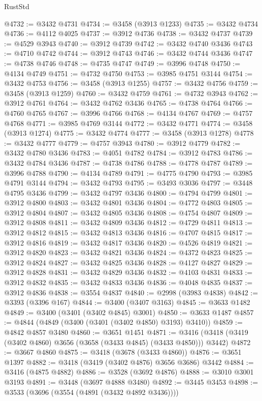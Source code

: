 \begin{lexlean}{RustStd}
\begin{coremodule}
@4732 := @3432 @4731
@4734 := @3458 (@3913 @1233)
@4735 := @3432 @4734
@4736 := @4112 @4025
@4737 := @3912 @4736
@4738 := @3432 @4737
@4739 := @4529 @3943
@4740 := @3912 @4739
@4742 := @3432 @4740 @3436
@4743 := @4710 @4742
@4744 := @3912 @4743
@4746 := @3432 @4744 @3436
@4747 := @4738 @4746
@4748 := @4735 @4747
@4749 := @3996 @4748
@4750 := @4134 @4749
@4751 := @4732 @4750
@4753 := @3985 @4751 @3144
@4754 := @3432 @4753
@4756 := @3458 (@3913 @1255)
@4757 := @3432 @4756
@4759 := @3458 (@3913 @1259)
@4760 := @3432 @4759
@4761 := @4732 @3943
@4762 := @3912 @4761
@4764 := @3432 @4762 @3436
@4765 := @4738 @4764
@4766 := @4760 @4765
@4767 := @3996 @4766
@4768 := @4134 @4767
@4769 := @4757 @4768
@4771 := @3985 @4769 @3144
@4772 := @3432 @4771
@4774 := @3458 (@3913 @1274)
@4775 := @3432 @4774
@4777 := @3458 (@3913 @1278)
@4778 := @3432 @4777
@4779 := @4757 @3943
@4780 := @3912 @4779
@4782 := @3432 @4780 @3436
@4783 := @4051 @4782
@4784 := @3912 @4783
@4786 := @3432 @4784 @3436
@4787 := @4738 @4786
@4788 := @4778 @4787
@4789 := @3996 @4788
@4790 := @4134 @4789
@4791 := @4775 @4790
@4793 := @3985 @4791 @3144
@4794 := @3432 @4793
@4795 := @3493 @3036
@4797 := @3448 @4795 @3436
@4799 := @3432 @4797 @3436
@4800 := @4794 @4799
@4801 := @3912 @4800
@4803 := @3432 @4801 @3436
@4804 := @4772 @4803
@4805 := @3912 @4804
@4807 := @3432 @4805 @3436
@4808 := @4754 @4807
@4809 := @3912 @4808
@4811 := @3432 @4809 @3436
@4812 := @4729 @4811
@4813 := @3912 @4812
@4815 := @3432 @4813 @3436
@4816 := @4707 @4815
@4817 := @3912 @4816
@4819 := @3432 @4817 @3436
@4820 := @4526 @4819
@4821 := @3912 @4820
@4823 := @3432 @4821 @3436
@4824 := @4372 @4823
@4825 := @3912 @4824
@4827 := @3432 @4825 @3436
@4828 := @4127 @4827
@4829 := @3912 @4828
@4831 := @3432 @4829 @3436
@4832 := @4103 @4831
@4833 := @3912 @4832
@4835 := @3432 @4833 @3436
@4836 := @4048 @4835
@4837 := @3912 @4836
@4838 := @3554 @4837
@4840 := @2998 (@3983 @4838)
@4842 := @3393 (@3396 @167)
@4844 := @3400 (@3407 @3163)
@4845 := @3633 @1482
@4849 := @3400 (@3401 (@3402 @4845) @3001)
@4850 := @3633 @1487
@4857 := @4844 (@4849 (@3400 (@3401 (@3402 @4850) @3193) @3410))
@4859 := @4842 @4857 @3480
@4860 := @3651 @1451
@4871 := @3416 (@3418 (@3419 (@3402 @4860) @3656 (@3658 (@3433 @4845) (@3433 @4850))) @3442)
@4872 := @3667 @4860
@4875 := @3418 (@3678 (@3433 @4860))
@4876 := @3651 @1397
@4882 := @3418 (@3419 (@3402 @4876) @3656 @3686) @3442
@4884 := @3416 (@4875 @4882)
@4886 := @3528 (@3692 @4876)
@4888 := @3010 @3001 @3193
@4891 := @3448 (@3697 @4888 @3480)
@4892 := @3445 @3453
@4898 := @3533 (@3696 (@3554 (@4891 (@3432 @4892 @3436))))

\end{coremodule}
\end{lexlean}
